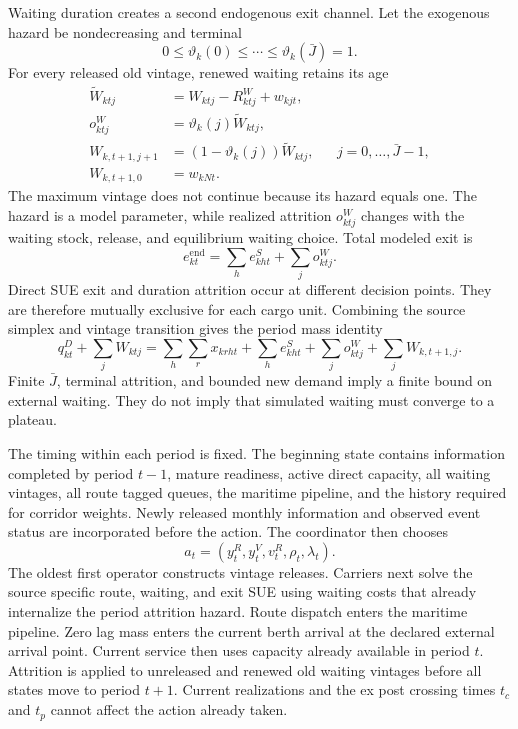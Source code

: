\documentclass[a4paper,fleqn]{cas-sc}
\begin{document}
Waiting duration creates a second endogenous exit channel. Let the exogenous
hazard be nondecreasing and terminal
\begin{equation}
 0\le\vartheta_k(0)\le\cdots\le
 \vartheta_k(\bar J)=1.
 \label{eq:waiting-hazard}
\end{equation}
For every released old vintage, renewed waiting retains its age
\begin{subequations}\label{eq:waiting-transition}
\begin{align}
 \widetilde W_{ktj}
 &=W_{ktj}-R^W_{ktj}+w_{kjt},\\
 o^W_{ktj}
 &=\vartheta_k(j)\widetilde W_{ktj},\\
 W_{k,t+1,j+1}
 &=(1-\vartheta_k(j))\widetilde W_{ktj},
 &&j=0,\ldots,\bar J-1,\\
 W_{k,t+1,0}&=w_{kNt}.
\end{align}
\end{subequations}
The maximum vintage does not continue because its hazard equals one. The
hazard is a model parameter, while realized attrition $o^W_{ktj}$ changes with
the waiting stock, release, and equilibrium waiting choice. Total modeled exit
is
\begin{equation}
 e^{\mathrm{end}}_{kt}
 =\sum_h e^S_{kht}+\sum_j o^W_{ktj}.
 \label{eq:endogenous-exit}
\end{equation}
Direct SUE exit and duration attrition occur at different decision points.
They are therefore mutually exclusive for each cargo unit. Combining the
source simplex and vintage transition gives the period mass identity
\begin{equation}
 q^D_{kt}+\sum_jW_{ktj}
 =
 \sum_h\sum_r x_{krht}
 +\sum_he^S_{kht}
 +\sum_jo^W_{ktj}
 +\sum_jW_{k,t+1,j}.
 \label{eq:adaptive-conservation}
\end{equation}
Finite $\bar J$, terminal attrition, and bounded new demand imply a finite
bound on external waiting. They do not imply that simulated waiting must
converge to a plateau.

The timing within each period is fixed. The beginning state contains
information completed by period $t-1$, mature readiness, active direct
capacity, all waiting vintages, all route tagged queues, the maritime pipeline,
and the history required for corridor weights. Newly released monthly
information and observed event status are incorporated before the action. The
coordinator then chooses
\begin{equation}
 a_t=(y^R_t,y^V_t,v^R_t,\rho_t,\lambda_t).
 \label{eq:formal-action}
\end{equation}
The oldest first operator constructs vintage releases. Carriers next solve the
source specific route, waiting, and exit SUE using waiting costs that already
internalize the period attrition hazard. Route dispatch enters the maritime
pipeline. Zero lag mass enters the current berth arrival at the declared
external arrival point. Current service then uses capacity already available
in period $t$. Attrition is applied to unreleased and renewed old waiting
vintages before all states move to period $t+1$. Current realizations and the
ex post crossing times $t_c$ and $t_p$ cannot affect the action already taken.
\end{document}
